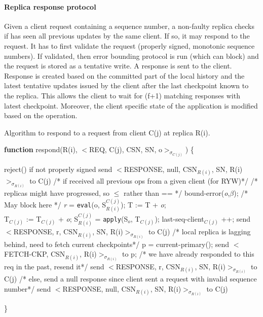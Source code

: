 \documentclass[twocolumn,10pt]{article}
\begin{document}
{\paragraph{Replica response protocol}
Given a client request containing a sequence number, a non-faulty replica
checks if has seen all previous updates by the same client. If so, it may respond
to the request. It has to first validate the
request (properly signed, monotonic sequence numbers). If validated, then
error bounding protocol is run (which can block) and 
the request is stored as a tentative write. A response is sent to the client. 
Response is created based on the committed part of the local history and
the latest tentative updates issued by the client after the last checkpoint
known to the replica. This allows the client to wait for (f+1) matching 
responses with latest checkpoint. Moreover, the client specific state of 
the application is modified based on the operation.

\begin{algorithm}
\caption{Algorithm to respond to a request from client C(j) at replica R(i). }
\textbf{function} respond(R(i), $<$REQ, C(j), CSN, SN, o$>_{\sigma_{C(j)}}$) \{
\begin{algorithmic}[1]\label{alg:response}
\STATE reject() if not properly signed
\STATE send $<$RESPONSE, null, CSN$_{R(i)}$, SN, R(i)$>_{\sigma_{R(i)}}$ to C(j)
\ENDIF
{}
\STATE /* if received all previous ops from a given client (for RYW)*/
\STATE /* replicas might have progressed, so $\le$ rather than == */
\STATE bound-error(\textit{o},$\beta$); /* May block here */
\STATE \textit{r} = \texttt{eval}(o, S$_{R(i)}^{C(j)}$);
\STATE T := T + \textit{o};\\
\STATE T$_{C(j)}$ := T$_{C(j)}$ + \textit{o};
\STATE S$_{R(i)}^{C(j)}$ = \texttt{apply}(S$_{o}$, T$_{C(j)}$);
\STATE last-seq-client$_{C(j)}$ ++;
\STATE send $<$RESPONSE, r, CSN$_{R(i)}$, SN, R(i)$>_{\sigma_{R(i)}}$ to C(j)
\ELSE
\STATE /* local replica is lagging behind, need to fetch current checkpoints*/
\STATE p = current-primary();
\STATE send $<$FETCH-CKP, CSN$_{R(i)}$, R(i)$>_{\sigma_{R(i)}}$ to p;
\ENDIF
\ELSE
{}
\STATE /* we have already responded to this req in the past, resend it*/
\STATE send $<$RESPONSE, r, CSN$_{R(i)}$, SN, R(i)$>_{\sigma_{R(i)}}$ to C(j)
\ELSE
\STATE /* else, send a null response since client sent a request with invalid
sequence number*/
\STATE send $<$RESPONSE, null, CSN$_{R(i)}$, SN, R(i)$>_{\sigma_{R(i)}}$ to C(j)
\ENDIF
\ENDIF
\end{algorithmic}
\}
\end{algorithm}
}
\end{document}
